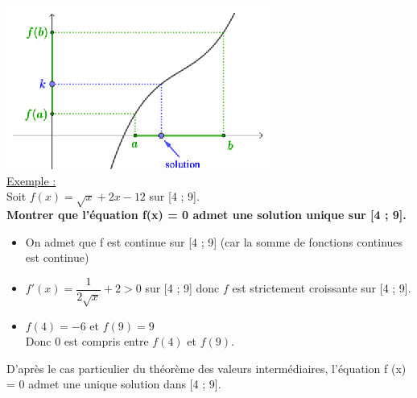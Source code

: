\documentclass[a4paper,12pt,twoside,french]{extarticle}
\newcommand{\bi}{\begin{itemize}}
\newcommand{\ei}{\end{itemize}}
\begin{document}
\includegraphics[scale=2]{tvimonotone.eps} \\




\underline{Exemple :}\\
Soit $f(x)=\sqrt{x}+2x-12$ sur [4 ; 9].\\
\textbf{Montrer que l'équation f(x) = 0 admet une solution unique sur [4 ; 9].}\\

\color{purple}
 
\bi 
\item On admet que f est continue sur [4 ; 9] (car la somme de
fonctions continues est continue)
\item $f'(x)=\dfrac{1}{2\sqrt{x}}+2 >0$ sur [4 ; 9] donc $f$ est strictement croissante sur [4 ; 9].
\item $f(4)=-6 $ et $f(9)=9$\\
Donc 0 est compris entre  $f(4)$ et $f(9)$.
\ei

D'après le cas particulier du théorème des valeurs intermédiaires, l'équation f (x) = 0 admet une unique solution dans [4 ; 9].

\color{black}

	
\end{document}
